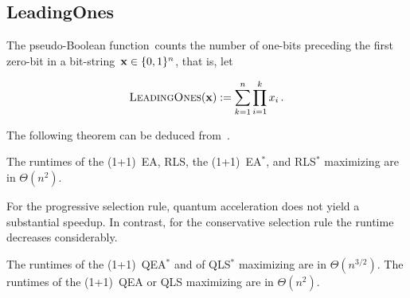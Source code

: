 \documentclass[a4paper,11pt]{article}
\begin{document}
\subsection{LeadingOnes}
\label{subsec:leadingones}
The pseudo-Boolean function~\leadingones counts the number of one-bits preceding the first zero-bit in a bit-string~$\xvec\in\{0,1\}^n$, that is, let

\begin{equation}
\leadingones(\xvec):=\sum_{k=1}^n\prod_{i=1}^k x_i\,.
\end{equation}


The following theorem can be deduced from~\cite{djwea02}.

\begin{theorem}\label{thm:leadingonesclassic}
 The runtimes of the (1+1)~EA, RLS, the (1+1)~EA$^*$, and RLS$^*$ maximizing \leadingones are in $\Theta(n^2)$.
\end{theorem}

For the progressive selection rule, quantum acceleration does not yield a substantial speedup. In contrast, for the conservative selection rule the runtime decreases considerably.

\begin{theorem}\label{thm:leadingonesquantum}
 The runtimes of the (1+1)~QEA$^*$ and of QLS$^*$ maximizing \leadingones are in $\Theta(n^{3/2})$. The runtimes of the (1+1)~QEA or QLS maximizing \leadingones are in $\Theta(n^{2})$.
\end{theorem}
\end{document}
